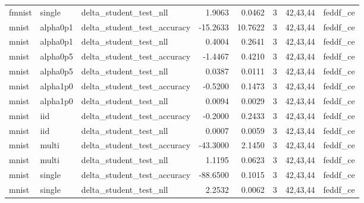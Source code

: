 \begin{tabular}{lllrrrll}
fmnist & single & delta\_student\_test\_nll & 1.9063 & 0.0462 & 3 & 42,43,44 & feddf\_ce \\
mnist & alpha0p1 & delta\_student\_test\_accuracy & -15.2633 & 10.7622 & 3 & 42,43,44 & feddf\_ce \\
mnist & alpha0p1 & delta\_student\_test\_nll & 0.4004 & 0.2641 & 3 & 42,43,44 & feddf\_ce \\
mnist & alpha0p5 & delta\_student\_test\_accuracy & -1.4467 & 0.4210 & 3 & 42,43,44 & feddf\_ce \\
mnist & alpha0p5 & delta\_student\_test\_nll & 0.0387 & 0.0111 & 3 & 42,43,44 & feddf\_ce \\
mnist & alpha1p0 & delta\_student\_test\_accuracy & -0.5200 & 0.1473 & 3 & 42,43,44 & feddf\_ce \\
mnist & alpha1p0 & delta\_student\_test\_nll & 0.0094 & 0.0029 & 3 & 42,43,44 & feddf\_ce \\
mnist & iid & delta\_student\_test\_accuracy & -0.2000 & 0.2433 & 3 & 42,43,44 & feddf\_ce \\
mnist & iid & delta\_student\_test\_nll & 0.0007 & 0.0059 & 3 & 42,43,44 & feddf\_ce \\
mnist & multi & delta\_student\_test\_accuracy & -43.3000 & 2.1450 & 3 & 42,43,44 & feddf\_ce \\
mnist & multi & delta\_student\_test\_nll & 1.1195 & 0.0623 & 3 & 42,43,44 & feddf\_ce \\
mnist & single & delta\_student\_test\_accuracy & -88.6500 & 0.1015 & 3 & 42,43,44 & feddf\_ce \\
mnist & single & delta\_student\_test\_nll & 2.2532 & 0.0062 & 3 & 42,43,44 & feddf\_ce \\
\bottomrule
\end{tabular}
